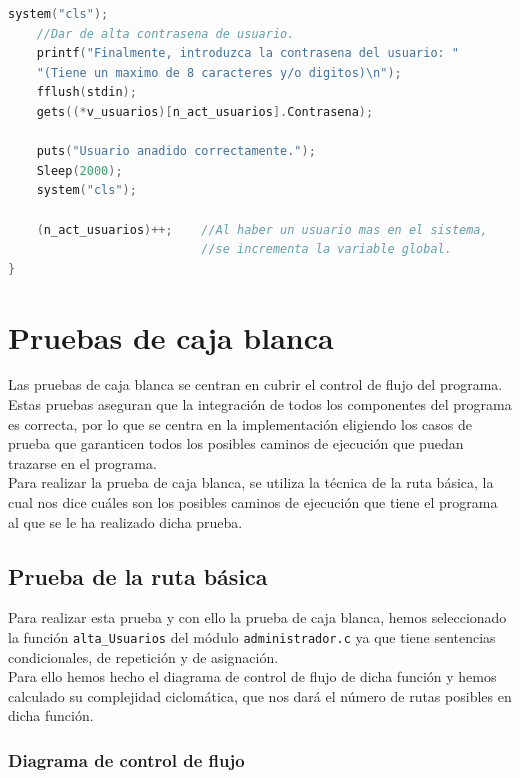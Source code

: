 \documentclass{book}
\begin{document}
\begin{lstlisting}[language=C]
    system("cls");
    //Dar de alta contrasena de usuario.
    printf("Finalmente, introduzca la contrasena del usuario: "
    "(Tiene un maximo de 8 caracteres y/o digitos)\n");
    fflush(stdin);
    gets((*v_usuarios)[n_act_usuarios].Contrasena);

    puts("Usuario anadido correctamente.");
    Sleep(2000);
    system("cls");

    (n_act_usuarios)++;    //Al haber un usuario mas en el sistema,
                           //se incrementa la variable global.
}
\end{lstlisting}
\section{Pruebas de caja blanca}
Las pruebas de caja blanca se centran en cubrir el control de flujo del programa. Estas pruebas aseguran que la integración de todos los componentes del programa es correcta, por lo que se centra en la implementación eligiendo los casos de prueba que garanticen todos los posibles caminos de ejecución que puedan trazarse en el programa.\\
Para realizar la prueba de caja blanca, se utiliza la técnica de la ruta básica, la cual nos dice cuáles son los posibles caminos de ejecución que tiene el programa al que se le ha realizado dicha prueba.\\
\subsection{Prueba de la ruta básica}
Para realizar esta prueba y con ello la prueba de caja blanca, hemos seleccionado la función \texttt{alta\_Usuarios} del módulo \texttt{administrador.c} ya que tiene sentencias condicionales, de repetición y de asignación.\\
Para ello hemos hecho el diagrama de control de flujo de dicha función y hemos calculado su complejidad ciclomática, que nos dará el número de rutas posibles en dicha función.\\
\newpage
\subsubsection{Diagrama de control de flujo}
\end{document}
